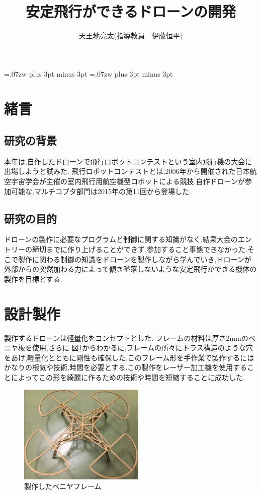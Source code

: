 \documentclass[twocolumn,11pt]{abst}
\title{安定飛行ができるドローンの開発}
\author{天王地亮太(指導教員　伊藤恒平)}
\begin{document}
\maketitle
\thispagestyle{fancy}
\pagestyle{fancy}

\setlength{\baselineskip}{5.6truemm}
\kanjiskip=.07zw plus 3pt minus 3pt
\xkanjiskip=.07zw plus 3pt minus 3pt



\section{緒言}
\subsection{研究の背景}
本年は,自作したドローンで飛行ロボットコンテストという室内飛行機の大会に出場しようと試みた.
飛行ロボットコンテストとは,2006年から開催された日本航空宇宙学会が主催の室内飛行用航空機型ロボットによる競技.自作ドローンが参加可能な,マルチコプタ部門は2015年の第11回から登場した.


\subsection{研究の目的}
ドローンの製作に必要なプログラムと制御に関する知識がなく,結果大会のエントリーの締切までに作り上げることができず,参加すること事態できなかった.そこで製作に関わる制御の知識をドローンを製作しながら学んでいき,ドローンが外部からの突然加わる力によって傾き墜落しないような安定飛行ができる機体の製作を目標とする.


\section{設計製作}
製作するドローンは軽量化をコンセプトとした.
フレームの材料は厚さ2mmのベニヤ板を使用,さらに 図\ref{fig:flame}からわかるに,フレームの所々にトラス構造のような穴をあけ,軽量化とともに剛性も確保した.このフレーム形を手作業で製作するにはかなりの根気や技術,時間を必要とする.この製作をレーザー加工機を使用することによってこの形を綺麗に作るための技術や時間を短縮することに成功した.


\begin{figure}[htbp]
  \begin{center}
    \includegraphics[width=60mm]{flame.jpg}
    \end{center}
  \caption{製作したベニヤフレーム}
 \label{fig:flame}
\end{figure}
\end{document}
